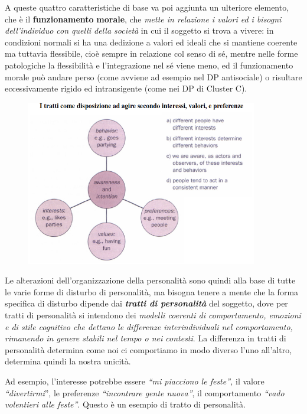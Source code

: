 A queste quattro caratteristiche di base va poi aggiunta un ulteriore
elemento, che è il \textbf{funzionamento} \textbf{morale}, che
\emph{mette in relazione i valori ed i bisogni dell'individuo con quelli
della società} in cui il soggetto si trova a vivere: in condizioni
normali si ha una dedizione a valori ed ideali che si mantiene coerente
ma tuttavia flessibile, cioè sempre in relazione col senso di sé, mentre
nelle forme patologiche la flessibilità e l'integrazione nel sé viene
meno, ed il funzionamento morale può andare perso (come avviene ad
esempio nel DP antisociale) o risultare eccessivamente rigido ed
intransigente (come nei DP di Cluster C).

\begin{figure}[!ht]
\centering
	\includegraphics[width=0.9\textwidth]{011/image1.png}
\end{figure}

Le
alterazioni dell'organizzazione della personalità sono quindi alla base
di tutte le varie forme di disturbo di personalità, ma bisogna tenere a
mente che la forma specifica di disturbo dipende dai
\textbf{\emph{tratti di personalità}} del soggetto, dove per tratti di
personalità si intendono dei \emph{modelli coerenti di comportamento,
emozioni e di stile cognitivo che dettano le differenze interindividuali
nel comportamento, rimanendo in genere stabili nel tempo o nei
contesti}. La differenza in tratti di personalità determina come noi ci
comportiamo in modo diverso l'uno all'altro, determina quindi la nostra
unicità.

Ad esempio, l'interesse potrebbe essere \emph{``mi piacciono le
feste'',} il valore \emph{``divertirmi}'', le preferenze
\emph{``incontrare gente nuova''}, il comportamento \emph{``vado
volentieri alle feste''}. Questo è un esempio di tratto di personalità.

